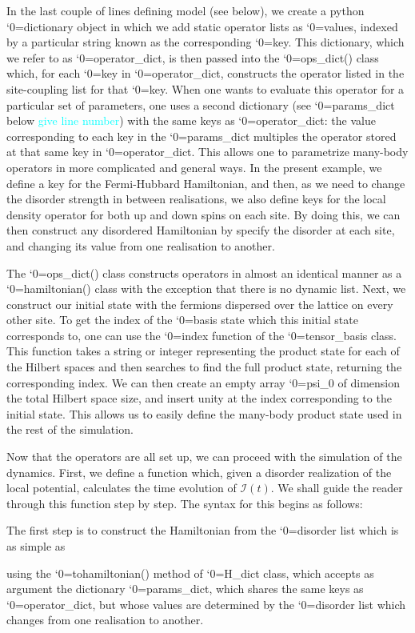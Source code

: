 \documentclass{SciPost}
\newcommand\0{\scalebox{-1}[1]{0}}
\let\svttfamily\ttfamily
\renewcommand\ttfamily{\svttfamily\catcode`0=\active }
\renewcommand\texttt{\bgroup\ttfamily\texttthelp}
\def\texttthelp#1{#1\egroup}
\newcommand*{\cyan}{\textcolor{cyan}}
\newcommand{\MBLcode}{example9.py}
\begin{document}
In the last couple of lines defining model (see below), we create a python \texttt{dictionary} object in which we add static operator lists as \texttt{values}, indexed by a particular string known as the corresponding \texttt{key}. This dictionary, which we refer to as \texttt{operator\_dict}, is then passed into the \texttt{ops\_dict()} class which, for each \texttt{key} in \texttt{operator\_dict}, constructs the operator listed in the site-coupling list for that \texttt{key}. When one wants to evaluate this operator for a particular set of parameters, one uses a second dictionary (see \texttt{params\_dict} below \cyan{give line number}) with the same keys as \texttt{operator\_dict}: the value corresponding to each key in the \texttt{params\_dict} multiples the operator stored at that same key in \texttt{operator\_dict}. This allows one to parametrize many-body operators in more complicated and general ways. In the present example, we define a key for the Fermi-Hubbard Hamiltonian, and then, as we need to change the disorder strength in between realisations, we also define keys for the local density operator for both up and down spins on each site. By doing this, we can then construct any disordered Hamiltonian by specify the disorder at each site, and changing its value from one realisation to another.

 

The \texttt{ops\_dict()} class constructs operators in almost an identical manner as a \texttt{hamiltonian()} class with the exception that there is no dynamic list. Next, we construct our initial state with the fermions dispersed over the lattice on every other site. To get the index of the \texttt{basis} state which this initial state corresponds to, one can use the \texttt{index} function of the \texttt{tensor\_basis} class. This function takes a string or integer representing the product state for each of the Hilbert spaces and then searches to find the full product state, returning the corresponding index. We can then create an empty array \texttt{psi\_0} of dimension the total Hilbert space size, and insert unity at the index corresponding to the initial state. This allows us to easily define the many-body product state used in the rest of the simulation.


Now that the operators are all set up, we can proceed with the simulation of the dynamics. First, we define a function which, given a disorder realization of the local potential, calculates the time evolution of $\mathcal{I}(t)$. We shall guide the reader through this function step by step. The syntax for this begins as follows:

The first step is to construct the Hamiltonian from the \texttt{disorder} list which is as simple as

using the \texttt{tohamiltonian()} method of \texttt{H\_dict} class, which accepts as argument the dictionary \texttt{params\_dict}, which shares the same keys as \texttt{operator\_dict}, but whose values are determined by the \texttt{disorder} list which changes from one realisation to another. 
\end{document}
